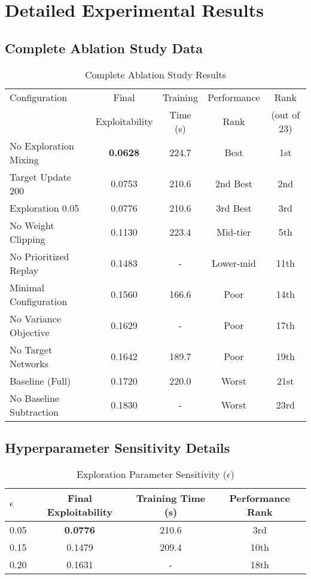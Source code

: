 \documentclass[12pt,a4paper]{article}
\begin{document}



\appendix

\section{Detailed Experimental Results}

\subsection{Complete Ablation Study Data}

\begin{table}[H]
\centering
\caption{Complete Ablation Study Results}
\begin{tabular}{@{}lcccc@{}}
\toprule
Configuration & Final & Training & Performance & Rank \\
 & Exploitability & Time (s) & Rank & (out of 23) \\
\midrule
No Exploration Mixing & \textbf{0.0628} & 224.7 & Best & 1st \\
Target Update 200 & 0.0753 & 210.6 & 2nd Best & 2nd \\
Exploration 0.05 & 0.0776 & 210.6 & 3rd Best & 3rd \\
No Weight Clipping & 0.1130 & 223.4 & Mid-tier & 5th \\
No Prioritized Replay & 0.1483 & - & Lower-mid & 11th \\
Minimal Configuration & 0.1560 & 166.6 & Poor & 14th \\
No Variance Objective & 0.1629 & - & Poor & 17th \\
No Target Networks & 0.1642 & 189.7 & Poor & 19th \\
Baseline (Full) & 0.1720 & 220.0 & Worst & 21st \\
No Baseline Subtraction & 0.1830 & - & Worst & 23rd \\
\bottomrule
\end{tabular}
\end{table}

\subsection{Hyperparameter Sensitivity Details}

\begin{table}[H]
\centering
\caption{Exploration Parameter Sensitivity ($\epsilon$)}
\begin{tabular}{@{}lccc@{}}
\toprule
$\epsilon$ & Final Exploitability & Training Time (s) & Performance Rank \\
\midrule
0.05 & \textbf{0.0776} & 210.6 & 3rd \\
0.15 & 0.1479 & 209.4 & 10th \\
0.20 & 0.1631 & - & 18th \\
\bottomrule
\end{tabular}
\end{table}
\end{document}
